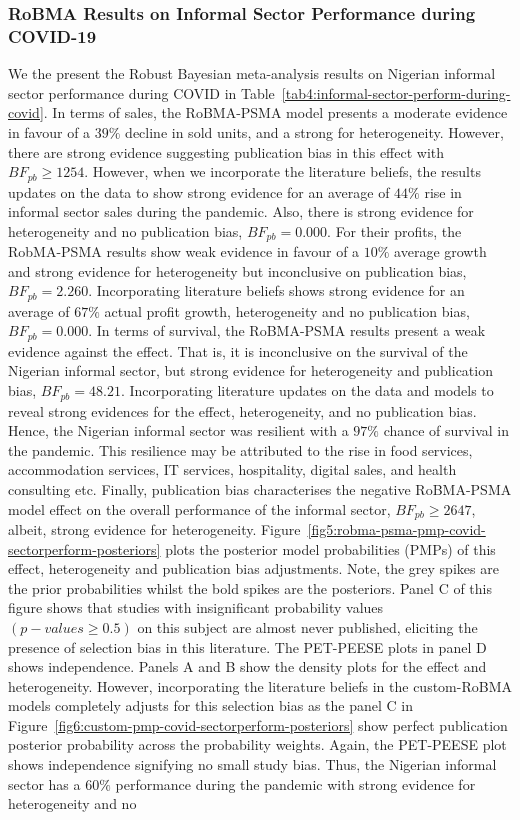 \documentclass[12pt, english]{article}
\begin{document}
    \subsubsection{RoBMA Results on Informal Sector Performance during COVID-19}\label{subsubsec:robma-results-on-informal-sector-performance-during-covid-19}
    We the present the Robust Bayesian meta-analysis results on Nigerian informal sector performance during COVID in Table~\ref{tab4:informal-sector-perform-during-covid}. In terms of sales, the RoBMA-PSMA model presents a moderate evidence in favour of a $39\%$ decline in sold units, and a strong for heterogeneity. However, there are strong evidence suggesting publication bias in this effect with $BF_{pb} \geq 1254$. However, when we incorporate the literature beliefs, the results updates on the data to show strong evidence for an average of $44\%$ rise in informal sector sales during the pandemic. Also, there is strong evidence for heterogeneity and no publication bias, $BF_{pb} = 0.000$. For their profits, the RobMA-PSMA results show weak evidence in favour of a $10\%$ average growth and strong evidence for heterogeneity but inconclusive on publication bias, $BF_{pb} = 2.260$. Incorporating literature beliefs shows strong evidence for an average of $67\%$ actual profit growth, heterogeneity and no publication bias, $BF_{pb} = 0.000$. In terms of survival, the RoBMA-PSMA results present a weak evidence against the effect. That is, it is inconclusive on the survival of the Nigerian informal sector, but strong evidence for heterogeneity and publication bias, $BF_{pb} = 48.21$. Incorporating literature updates on the data and models to reveal strong evidences for the effect, heterogeneity, and no publication bias. Hence, the Nigerian informal sector was resilient with a $97\%$ chance of survival in the pandemic. This resilience may be attributed to the rise in food services, accommodation services, IT services, hospitality, digital sales, and health consulting etc. Finally, publication bias characterises the negative RoBMA-PSMA model effect on the overall performance of the informal sector, $BF_{pb} \geq 2647$, albeit, strong evidence for heterogeneity. Figure~\ref{fig5:robma-psma-pmp-covid-sectorperform-posteriors} plots the posterior model probabilities (PMPs) of this effect, heterogeneity and publication bias adjustments. Note, the grey spikes are the prior probabilities whilst the bold spikes are the posteriors. Panel C of this figure shows that studies with insignificant probability values $(p-values \geq 0.5)$ on this subject are almost never published, eliciting the presence of selection bias in this literature. The PET-PEESE plots in panel D shows independence. Panels A and B show the density plots for the effect and heterogeneity. However, incorporating the literature beliefs in the custom-RoBMA models completely adjusts for this selection bias as the panel C in Figure~\ref{fig6:custom-pmp-covid-sectorperform-posteriors} show perfect publication posterior probability across the probability weights. Again, the PET-PEESE plot shows independence signifying no small study bias. Thus, the Nigerian informal sector has a $60\%$ performance during the pandemic with strong evidence for heterogeneity and no 
\end{document}
